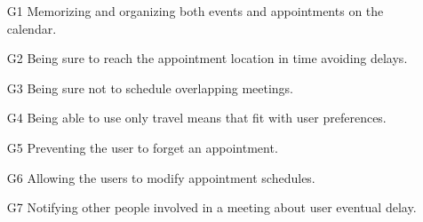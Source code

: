 \begin{itemize}

\item[G1]  Memorizing and organizing both events and appointments on the calendar.

\item[G2] Being sure to reach the appointment location in time avoiding delays.

\item[G3] Being sure not to schedule overlapping meetings.

\item[G4] Being able to use only travel means that fit with user preferences.

\item[G5] Preventing the user to forget an appointment.

\item[G6] Allowing the users to modify appointment schedules.

\item[G7] Notifying other people involved in a meeting about user eventual delay. 

\end{itemize}
